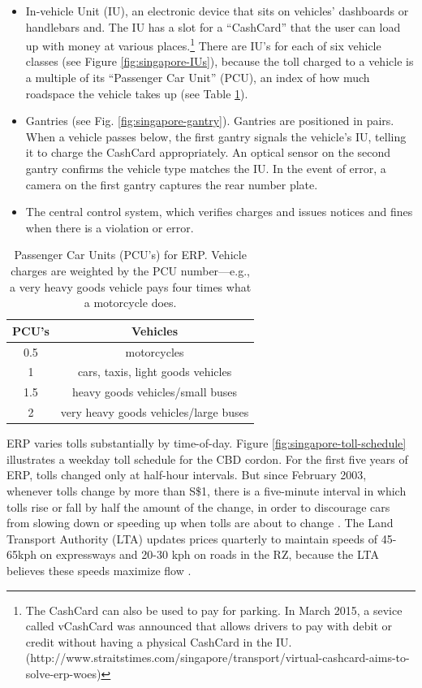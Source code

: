 \begin{itemize}
\item In-vehicle Unit (IU), an electronic device that sits on vehicles' dashboards or handlebars and. The IU has a slot for a ``CashCard'' that the user can load up with money at various places.\footnote{The CashCard can also be used to pay for parking. In March 2015, a sevice called vCashCard was announced that allows drivers to pay with debit or credit without having a physical CashCard in the IU. (http://www.straitstimes.com/singapore/transport/virtual-cashcard-aims-to-solve-erp-woes)} There are IU's for each of six vehicle classes (see Figure \ref{fig:singapore-IUs}), because the toll charged to a vehicle is a multiple of its ``Passenger Car Unit'' (PCU), an index of how much roadspace the vehicle takes up (see Table \ref{tab:passenger-car-units}). 

\item Gantries (see Fig. \ref{fig:singapore-gantry}). Gantries are positioned in pairs. When a vehicle passes below, the first gantry signals the vehicle's IU, telling it to charge the CashCard appropriately. An optical sensor on the second gantry confirms the vehicle type matches the IU. In the event of error, a camera on the first gantry captures the rear number plate. 

\item The central control system, which verifies charges and issues notices and fines when there is a violation or error.
\end{itemize}

\begin{table}
	\begin{tabular}{|c|c|}
		\hline 
		PCU's & Vehicles\tabularnewline                              
		\hline 
		\hline 
		0.5   & motorcycles\tabularnewline                           
		\hline 
		1     & cars, taxis, light goods vehicles\tabularnewline     
		\hline 
		1.5   & heavy goods vehicles/small buses\tabularnewline      
		\hline 
		2     & very heavy goods vehicles/large buses\tabularnewline 
		\hline 
	\end{tabular}
	
	\caption{
	Passenger Car Units (PCU's) for ERP. Vehicle charges are weighted by the PCU number---e.g., a very heavy goods vehicle pays four times what a motorcycle does. \citep{LTA2016} 
	}
	\label{tab:passenger-car-units}
\end{table}

ERP varies tolls substantially by time-of-day. Figure \ref{fig:singapore-toll-schedule} illustrates a weekday toll schedule for the CBD cordon. For the first five years of ERP, tolls changed only at half-hour intervals. But since February 2003, whenever tolls change by more than S\$1, there is a five-minute interval in which tolls rise or fall by half the amount of the change, in order to discourage cars from slowing down or speeding up when tolls are about to change \citep{Menon2004}. The Land Transport Authority (LTA) updates prices quarterly to maintain speeds of 45-65kph on expressways and 20-30 kph on roads in the RZ, because the LTA believes these speeds maximize flow \citep{Li1999}.
	
